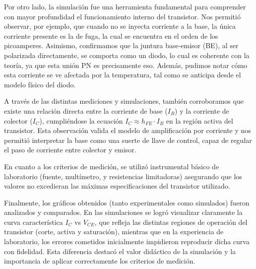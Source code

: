 \documentclass[chaptersright]{informeutn}
\begin{document}
  Por otro lado, la simulación fue una herramienta fundamental para comprender con mayor profundidad el funcionamiento 
  interno del transistor. Nos permitió observar, por ejemplo, que cuando no se inyecta corriente a la base, la única 
  corriente presente es la de fuga, la cual se encuentra en el orden de los picoamperes. Asimismo, confirmamos que la 
  juntura base-emisor (BE), al ser polarizada directamente, se comporta como un diodo, lo cual es coherente con la 
  teoría, ya que esta unión PN es precisamente eso. Además, pudimos notar cómo esta corriente se ve afectada por la 
  temperatura, tal como se anticipa desde el modelo físico del diodo.
  
  A través de las distintas mediciones y simulaciones, también corroboramos que existe una relación directa entre la 
  corriente de base ($I_B$) y la corriente de colector ($I_C$), cumpliéndose la ecuación $I_C \approx h_{FE} \cdot I_B$ 
  en la región activa del transistor. Esta observación valida el modelo de amplificación por corriente y nos permitió 
  interpretar la base como una suerte de llave de control, capaz de regular el paso de corriente entre colector y
  emisor.
  
  En cuanto a los criterios de medición, se utilizó instrumental básico de laboratorio (fuente, multímetro, y 
  resistencias limitadoras) asegurando que los valores no excedieran las máximas especificaciones del transistor 
  utilizado.

  Finalmente, los gráficos obtenidos (tanto experimentales como simulados) fueron analizados y comparados. En las 
  simulaciones se logró visualizar claramente la curva característica $I_C$ vs $V_{CE}$, que refleja las distintas 
  regiones de operación del transistor (corte, activa y saturación), mientras que en la experiencia de laboratorio, los 
  errores cometidos inicialmente impidieron reproducir dicha curva con fidelidad. Esta diferencia destacó el valor 
  didáctico de la simulación y la importancia de aplicar correctamente los criterios de medición. 
\end{document}
